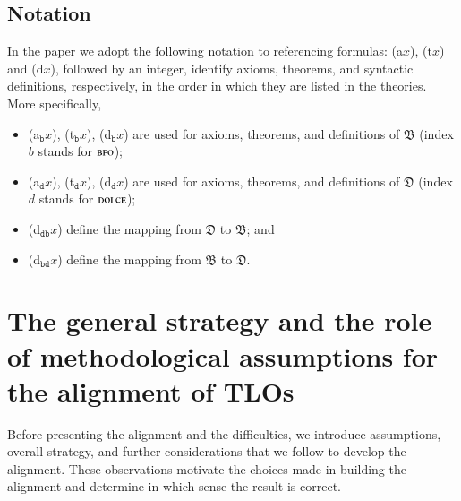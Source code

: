 \documentclass[ao]{iosart2x}
\newcommand{\bfoAxLabel}{\textrm{a$_\texttt{b}$}}
\newcommand{\bfoDefLabel}{\textrm{d$_\texttt{b}$}}
\newcommand{\bfoThrLabel}{\textrm{t$_\texttt{b}$}}
\newcommand{\dolceAxLabel}{\textrm{a$_\texttt{d}$}}
\newcommand{\dolceDefLabel}{\textrm{d$_\texttt{d}$}}
\newcommand{\dolceThrLabel}{\textrm{t$_\texttt{d}$}}
\newcommand{\dbDefLabel}{\textrm{d$_\texttt{db}$}}
\newcommand{\dbThrLabel}{\textrm{t$_\texttt{db}$}}
\newcommand{\dbAxLabel}{\textrm{a}$_\texttt{db}$}
\newcommand{\bdDefLabel}{\textrm{d$_\texttt{bd}$}}
\newcommand{\bdThrLabel}{\textrm{t$_\texttt{bd}$}}
\newcommand{\bdAxLabel}{\textrm{a}$_\texttt{bd}$}
\newcommand{\dolce}{{\textsc{dolce}}}
\newcommand{\bfo}{{\textsc{bfo}}}
\newcommand {\thdolce} {\ensuremath{\mathfrak{D}}}
\newcommand {\thbfo} {\ensuremath{\mathfrak{B}}}
\begin{document}
\subsection{Notation}
In the paper we adopt the following notation to referencing formulas: ({\rm a}$x$), ({\rm t}$x$) and ({\rm d}$x$), followed by an integer, identify axioms, theorems, and syntactic definitions, respectively, in the order in which they are listed in the theories. More specifically,
\begin{itemize}
\item (\bfoAxLabel $x$), (\bfoThrLabel $x$), (\bfoDefLabel $x$) are used for axioms, theorems, and definitions of $\thbfo$ (index $b$ stands for $\bfo$); 
\item (\dolceAxLabel $x$), (\dolceThrLabel $x$), (\dolceDefLabel $x$) are used for axioms, theorems, and definitions of {$\thdolce$} (index $d$ stands for $\dolce$); 
\item %
(\dbDefLabel $x$) define %
the mapping  from ${\thdolce}$ to ${\thbfo}$; and
\item %
(\bdDefLabel $x$) define %
the mapping  from ${\thbfo}$ to ${\thdolce}$.  
\end{itemize}


\section{The general strategy and the role of methodological assumptions for the alignment of TLOs}\label{sect_methodology}


Before presenting the alignment and the difficulties, we introduce assumptions, overall strategy, and further considerations that we follow to develop the alignment. These observations motivate the choices made in building the alignment and determine in which sense the result is correct.
\end{document}
